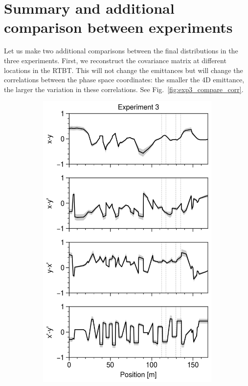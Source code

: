 \section{Summary and additional comparison between experiments}

Let us make two additional comparisons between the final distributions in the three experiments. First, we reconstruct the covariance matrix at different locations in the RTBT. This will not change the emittances but will change the correlations between the phase space coordinates: the smaller the 4D emittance, the larger the variation in these correlations. See Fig.~\ref{fig:exp3_compare_corr}.
%
\begin{figure}[!p]
    \centering
    \vspace*{3.0cm}
    \begin{subfigure}{0.32\textwidth}
        \includegraphics[width=\textwidth]{Images/chapter5/exp3/compare_corr.png}

\end{subfigure}
\end{figure}
